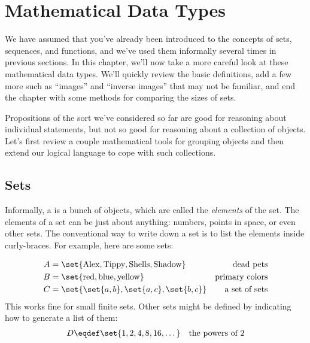 \chapter{Mathematical Data Types}\label{data_chap}

\newcommand{\inchrg}{\textit{Chrg}}
\newcommand{\facdom}{\text{Fac}}
\newcommand{\subnums}{\text{SubNums}}
\newcommand{\introsub}{\text{Intro}}

We have assumed that you've already been introduced to the concepts of
sets, sequences, and functions, and we've used them informally several
times in previous sections.  In this chapter, we'll now take a more
careful look at these mathematical data types.  We'll quickly review
the basic definitions, add a few more such as ``images'' and ``inverse
images'' that may not be familiar, and end the chapter with some
methods for comparing the sizes of sets.

\begin{editingnotes}
Propositions of the sort we've considered so far are good for
reasoning about individual statements, but not so good for reasoning
about a collection of objects.  Let's first review a couple
mathematical tools for grouping objects and then extend our logical
language to cope with such collections.
\end{editingnotes}

\section{Sets}
Informally, a  is a bunch of objects, which are called the
\emph{elements} of the set.  The elements of a set can be just about
anything: numbers, points in space, or even other sets.  The conventional
way to write down a set is to list the elements inside curly-braces.  For
example, here are some sets:

\begin{align*}
A & =  \set{\text{Alex}, \text{Tippy}, \text{Shells}, \text{Shadow}} & \text{dead pets} \\
B & =  \set{\text{red}, \text{blue}, \text{yellow}} & \text{primary colors} \\
C & =  \set{ \set{a, b}, \set{a, c}, \set{b, c}} & \text{a set of sets}
\end{align*}
This works fine for small finite sets.  Other sets might be defined by
indicating how to generate a list of them:
\begin{align*}
D & \eqdef  \set{1,2,4,8,16,\dots} & \text{the powers of 2}
\end{align*}

